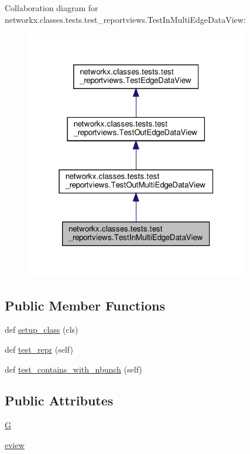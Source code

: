 Collaboration diagram for networkx.\+classes.\+tests.\+test\+\_\+reportviews.\+Test\+In\+Multi\+Edge\+Data\+View\+:
\nopagebreak
\begin{figure}[H]
\begin{center}
\leavevmode
\includegraphics[width=277pt]{classnetworkx_1_1classes_1_1tests_1_1test__reportviews_1_1TestInMultiEdgeDataView__coll__graph}
\end{center}
\end{figure}
\subsection*{Public Member Functions}
\begin{DoxyCompactItemize}
\item 
def \hyperlink{classnetworkx_1_1classes_1_1tests_1_1test__reportviews_1_1TestInMultiEdgeDataView_adda27cf673d9504a1580957424357942}{setup\+\_\+class} (cls)
\item 
def \hyperlink{classnetworkx_1_1classes_1_1tests_1_1test__reportviews_1_1TestInMultiEdgeDataView_a69a3219ec6418a4cbe8ee320c39026aa}{test\+\_\+repr} (self)
\item 
def \hyperlink{classnetworkx_1_1classes_1_1tests_1_1test__reportviews_1_1TestInMultiEdgeDataView_a55725afee4bd5eb5038f3877e9d8b718}{test\+\_\+contains\+\_\+with\+\_\+nbunch} (self)
\end{DoxyCompactItemize}
\subsection*{Public Attributes}
\begin{DoxyCompactItemize}
\item 
\hyperlink{classnetworkx_1_1classes_1_1tests_1_1test__reportviews_1_1TestInMultiEdgeDataView_adb4b0b00d16135fef755504885b2b7c1}{G}
\item 
\hyperlink{classnetworkx_1_1classes_1_1tests_1_1test__reportviews_1_1TestInMultiEdgeDataView_a9317365d06bd74563d5ff1fb8a8188c6}{eview}
\end{DoxyCompactItemize}


